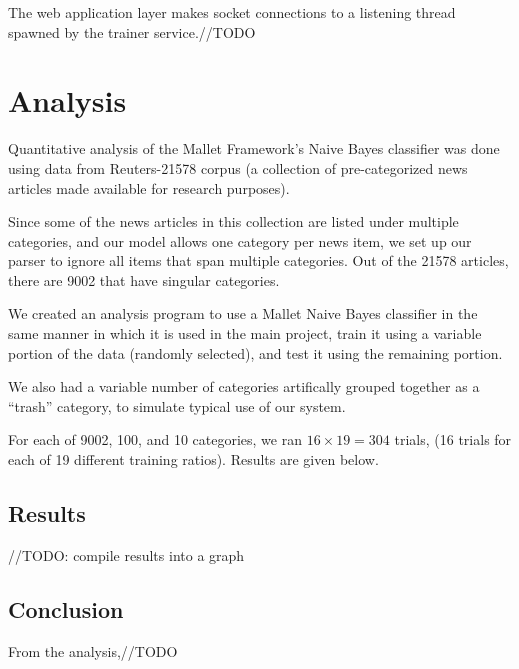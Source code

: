 \documentclass[letterpaper]{article}
\begin{document}
The web application layer makes socket connections to a listening thread spawned by the trainer service.//TODO

\section{Analysis}
Quantitative analysis of the Mallet Framework's Naive Bayes classifier was done using data from Reuters-21578 corpus \cite{Reuters21578} (a collection of pre-categorized news articles made available for research purposes).

Since some of the news articles in this collection are listed under multiple categories, and our model allows one category per news item, we set up our parser to ignore all items that span multiple categories. Out of the 21578 articles, there are 9002 that have singular categories.

We created an analysis program to use a Mallet Naive Bayes classifier in the same manner in which it is used in the main project, train it using a variable portion of the data (randomly selected), and test it using the remaining portion.

We also had a variable number of categories artifically grouped together as a ``trash'' category, to simulate typical use of our system. 

For each of 9002, 100, and 10 categories, we ran $16\times 19=304$ trials, (16 trials for each of 19 different training ratios). Results are given below.

\subsection{Results}
//TODO: compile results into a graph

\subsection{Conclusion}
From the analysis,//TODO



\end{document}
